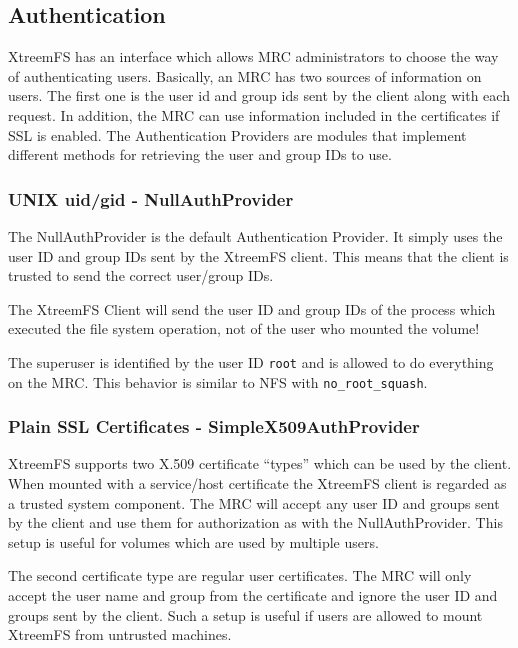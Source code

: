 \documentclass[a4paper,10pt]{book}
\begin{document}
\subsection{Authentication}
\label{sec:AuthProvider}
XtreemFS has an interface which allows MRC administrators to choose the way of authenticating users. Basically, an MRC has two sources of information on users. The first one is the user id and group ids sent by the client along with each request. In addition, the MRC can use information included in the certificates if SSL is enabled. The Authentication Providers are modules that implement different methods for retrieving the user and group IDs to use.

\subsubsection{UNIX uid/gid - NullAuthProvider}

The NullAuthProvider is the default Authentication Provider. It simply uses the user ID and group IDs sent by the XtreemFS client. This means that the client is trusted to send the correct user/group IDs.

The XtreemFS Client will send the user ID and group IDs of the process which executed the file system operation, not of the user who mounted the volume!

The superuser is identified by the user ID \texttt{root} and is allowed to do everything on the MRC. This behavior is similar to NFS with \texttt{no\_root\_squash}.

\subsubsection{Plain SSL Certificates - SimpleX509AuthProvider}

XtreemFS supports two X.509 certificate ``types'' which can be used by the client. When mounted with a service/host certificate the XtreemFS client is regarded as a trusted system component. The MRC will accept any user ID and groups sent by the client and use them for authorization as with the NullAuthProvider. This setup is useful for volumes which are used by multiple users.

The second certificate type are regular user certificates. The MRC will only accept the user name and group from the certificate and ignore the user ID and groups sent by the client. Such a setup is useful if users are allowed to mount XtreemFS from untrusted machines.
\end{document}
